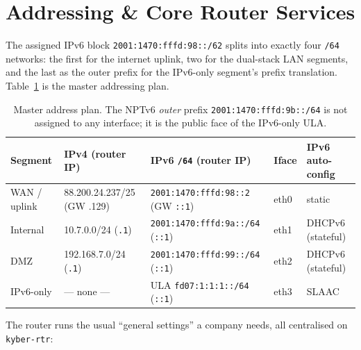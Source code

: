\documentclass[11pt,a4paper]{article}
\newcommand{\code}[1]{\texttt{#1}}
\begin{document}
\section{Addressing \& Core Router Services}
\label{sec:addr}

The assigned IPv6 block \code{2001:1470:fffd:98::/62} splits into exactly four \code{/64}
networks: the first for the internet uplink, two for the
dual-stack LAN segments, and the last as the outer prefix for the IPv6-only segment's
prefix translation. Table~\ref{tab:addr} is the master addressing plan.

\begin{table}[htbp]
\centering
\footnotesize
\setlength{\tabcolsep}{5pt}
\begin{tabularx}{\linewidth}{@{}l l l l X@{}}
\toprule
\textbf{Segment} & \textbf{IPv4 (router IP)} & \textbf{IPv6 \code{/64} (router IP)} & \textbf{Iface} & \textbf{IPv6 auto-config} \\
\midrule
WAN / uplink & 88.200.24.237/25 (GW .129) & \code{2001:1470:fffd:98::2} (GW \code{::1}) & eth0 & static \\
Internal     & 10.7.0.0/24 (\code{.1})    & \code{2001:1470:fffd:9a::/64} (\code{::1})  & eth1 & DHCPv6 (stateful) \\
DMZ          & 192.168.7.0/24 (\code{.1}) & \code{2001:1470:fffd:99::/64} (\code{::1})  & eth2 & DHCPv6 (stateful) \\
IPv6-only    & --- none ---               & ULA \code{fd07:1:1:1::/64} (\code{::1})     & eth3 & SLAAC \\
\bottomrule
\end{tabularx}
\caption{Master address plan. The NPTv6 \emph{outer} prefix \code{2001:1470:fffd:9b::/64}
         is not assigned to any interface; it is the public face of the IPv6-only ULA.}
\label{tab:addr}
\end{table}

The router runs the usual ``general settings'' a company needs, all centralised on
\code{kyber-rtr}:
\end{document}

